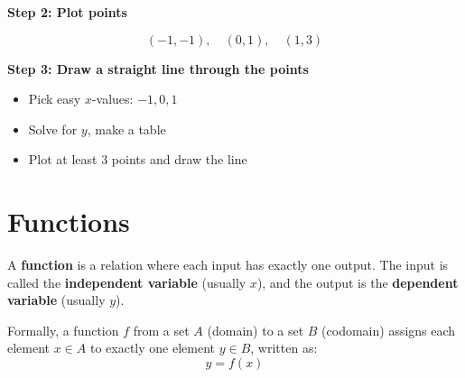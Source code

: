 \documentclass[11pt]{article}
\begin{document}
\textbf{Step 2: Plot points}

\[
(-1, -1), \quad (0, 1), \quad (1, 3)
\]

\textbf{Step 3: Draw a straight line through the points}

\begin{center}
\end{center}

\begin{tcolorbox}[colback=blue!5!white, colframe=blue!80!black, title=Graphing Summary]
\begin{itemize}
  \item Pick easy \( x \)-values: \( -1, 0, 1 \)
  \item Solve for \( y \), make a table
  \item Plot at least 3 points and draw the line
\end{itemize}
\end{tcolorbox}

\section{Functions}

A \textbf{function} is a relation where each input has exactly one output. The input is called the \textbf{independent variable} (usually \( x \)), and the output is the \textbf{dependent variable} (usually \( y \)).

Formally, a function \( f \) from a set \( A \) (domain) to a set \( B \) (codomain) assigns each element \( x \in A \) to exactly one element \( y \in B \), written as:
\[
y = f(x)
\]

\bigskip
\end{document}
